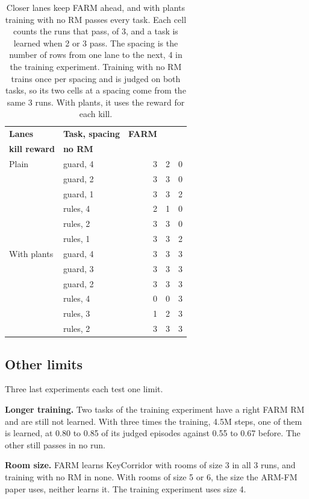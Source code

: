 \documentclass[11pt,english,listoffigures,listoftables]{tfgetsinf}
\begin{document}
\begin{table}[H]
\centering
\footnotesize
\renewcommand{\arraystretch}{1.15}
\begin{tabular}{@{}llrrr@{}}
\toprule
\textbf{Lanes} & \textbf{Task, spacing} & \textbf{FARM} & \shortstack{\textbf{FARM with the}\\\textbf{kill reward}} & \textbf{no RM} \\ \midrule
Plain & guard, 4 & 3 & 2 & 0 \\
 & guard, 2 & 3 & 3 & 0 \\
 & guard, 1 & 3 & 3 & 2 \\
 & rules, 4 & 2 & 1 & 0 \\
 & rules, 2 & 3 & 3 & 0 \\
 & rules, 1 & 3 & 3 & 2 \\ \midrule
With plants & guard, 4 & 3 & 3 & 3 \\
 & guard, 3 & 3 & 3 & 3 \\
 & guard, 2 & 3 & 3 & 3 \\
 & rules, 4 & 0 & 0 & 3 \\
 & rules, 3 & 1 & 2 & 3 \\
 & rules, 2 & 3 & 3 & 3 \\ \bottomrule
\end{tabular}
\caption[The zombie lanes under change]{Closer lanes keep FARM ahead, and with plants training with no RM passes every task. Each cell counts the runs that pass, of 3, and a task is learned when 2 or 3 pass. The spacing is the number of rows from one lane to the next, 4 in the training experiment. Training with no RM trains once per spacing and is judged on both tasks, so its two cells at a spacing come from the same 3 runs. With plants, it uses the reward for each kill.}
\label{tab:res-lanes-more}
\end{table}

\subsection{Other limits}
\label{sec:res-other-limits}

Three last experiments each test one limit.

\textbf{Longer training.} Two tasks of the training experiment have a right FARM RM and are still not learned. With three times the training, 4.5M steps, one of them is learned, at 0.80 to 0.85 of its judged episodes against 0.55 to 0.67 before. The other still passes in no run.

\textbf{Room size.} FARM learns KeyCorridor with rooms of size 3 in all 3 runs, and training with no RM in none. With rooms of size 5 or 6, the size the ARM-FM paper uses, neither learns it. The training experiment uses size 4.
\end{document}
